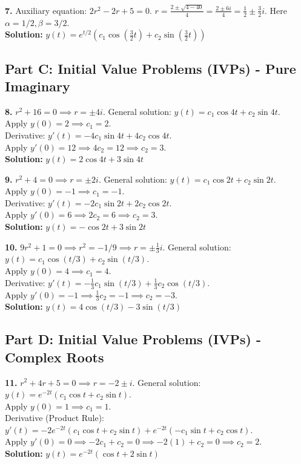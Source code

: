 \documentclass[11pt]{article}
\begin{document}
\vspace{0.5cm}
\noindent\textbf{7.} Auxiliary equation: $2r^2 - 2r + 5 = 0$. $r = \frac{2 \pm \sqrt{4 - 40}}{4} = \frac{2 \pm 6i}{4} = \frac{1}{2} \pm \frac{3}{2}i$. Here $\alpha=1/2, \beta=3/2$. \\
\textbf{Solution:} $y(t) = e^{t/2}\left(c_1 \cos\left(\frac{3}{2}t\right) + c_2 \sin\left(\frac{3}{2}t\right)\right)$

\subsection*{Part C: Initial Value Problems (IVPs) - Pure Imaginary}
\textbf{8.} $r^2 + 16 = 0 \implies r = \pm 4i$. General solution: $y(t) = c_1 \cos 4t + c_2 \sin 4t$. \\
Apply $y(0) = 2 \implies c_1 = 2$. \\
Derivative: $y'(t) = -4c_1 \sin 4t + 4c_2 \cos 4t$. \\
Apply $y'(0) = 12 \implies 4c_2 = 12 \implies c_2 = 3$. \\
\textbf{Solution:} $y(t) = 2\cos 4t + 3\sin 4t$

\vspace{0.5cm}
\noindent\textbf{9.} $r^2 + 4 = 0 \implies r = \pm 2i$. General solution: $y(t) = c_1 \cos 2t + c_2 \sin 2t$. \\
Apply $y(0) = -1 \implies c_1 = -1$. \\
Derivative: $y'(t) = -2c_1 \sin 2t + 2c_2 \cos 2t$. \\
Apply $y'(0) = 6 \implies 2c_2 = 6 \implies c_2 = 3$. \\
\textbf{Solution:} $y(t) = -\cos 2t + 3\sin 2t$

\vspace{0.5cm}
\noindent\textbf{10.} $9r^2 + 1 = 0 \implies r^2 = -1/9 \implies r = \pm \frac{1}{3}i$. General solution: $y(t) = c_1 \cos(t/3) + c_2 \sin(t/3)$. \\
Apply $y(0) = 4 \implies c_1 = 4$. \\
Derivative: $y'(t) = -\frac{1}{3}c_1 \sin(t/3) + \frac{1}{3}c_2 \cos(t/3)$. \\
Apply $y'(0) = -1 \implies \frac{1}{3}c_2 = -1 \implies c_2 = -3$. \\
\textbf{Solution:} $y(t) = 4\cos(t/3) - 3\sin(t/3)$

\subsection*{Part D: Initial Value Problems (IVPs) - Complex Roots}
\textbf{11.} $r^2 + 4r + 5 = 0 \implies r = -2 \pm i$. General solution: $y(t) = e^{-2t}(c_1 \cos t + c_2 \sin t)$. \\
Apply $y(0) = 1 \implies c_1 = 1$. \\
Derivative (Product Rule): $y'(t) = -2e^{-2t}(c_1 \cos t + c_2 \sin t) + e^{-2t}(-c_1 \sin t + c_2 \cos t)$. \\
Apply $y'(0) = 0 \implies -2c_1 + c_2 = 0 \implies -2(1) + c_2 = 0 \implies c_2 = 2$. \\
\textbf{Solution:} $y(t) = e^{-2t}(\cos t + 2\sin t)$
\end{document}
